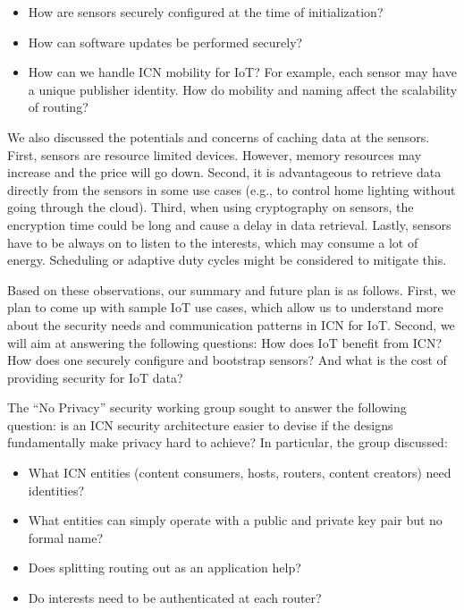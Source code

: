 \documentclass[a4paper,UKenglish]{dagrep}
\begin{document}
\begin{itemize}
\item How are sensors securely configured at the time of initialization?
\item How can software updates be performed securely?
\item How can we handle ICN mobility for IoT? For example, each sensor may have a unique publisher identity. How do mobility and naming affect the scalability of routing?
\end{itemize}

We also discussed the potentials and concerns of caching data at the sensors. First, sensors are resource limited devices. However, memory resources may increase and the price will go down. Second, it is advantageous to retrieve data directly from the sensors in some use cases (e.g., to control home lighting without going through the cloud). Third, when using cryptography on sensors, the encryption time could be long and cause a delay in data retrieval. Lastly, sensors have to be always on to listen to the interests, which may consume a lot of energy. Scheduling or adaptive duty cycles might be considered to mitigate this.

Based on these observations, our summary and future plan is as follows. First, we plan to come up with sample IoT use cases, which allow us to understand more about the security needs and communication patterns in ICN for IoT. Second, we will aim at answering the following questions: How does IoT benefit from ICN? How does one securely configure and bootstrap sensors? And what is the cost of providing security for IoT data?

\license

The ``No Privacy'' security working group sought to answer the following question: is an ICN security architecture easier to devise if the designs fundamentally make privacy hard to achieve? In particular, the group discussed:

\begin{itemize}
\item What ICN entities (content consumers, hosts, routers, content creators) need identities?
\item What entities can simply operate with a public and private key pair but no formal name?
\item Does splitting routing out as an application help?
\item Do interests need to be authenticated at each router?
\end{itemize}
\end{document}
